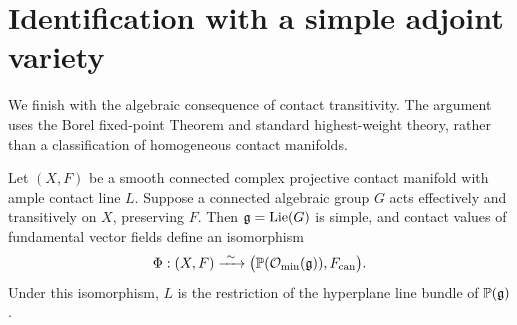 \section{Identification with a simple adjoint variety}
\label{hom:section}

We finish with the algebraic consequence of contact transitivity. The
argument uses the Borel fixed-point Theorem and standard highest-weight
theory, rather than a classification of homogeneous contact manifolds.

\begin{proposition}\label{hom:adjoint}
Let $(X,F)$ be a smooth connected complex projective contact manifold
with ample contact line $L$. Suppose a connected algebraic group $G$
acts effectively and transitively on $X$, preserving $F$. Then
$\mathfrak g=\operatorname{Lie}(G)$ is simple, and contact values of fundamental
vector fields define an isomorphism
\[
 \Phi:(X,F)\xrightarrow{\ \sim\ }
 \bigl(\mathbb P(\mathcal O_{\min}(\mathfrak g)),F_{\mathrm{can}}\bigr).
\]
Under this isomorphism, $L$ is the restriction of the hyperplane line
bundle of $\mathbb P(\mathfrak g)$.
\end{proposition}

